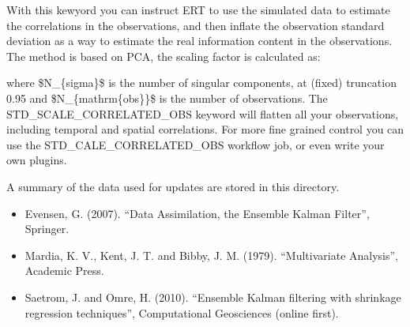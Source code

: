 \documentclass[letterpaper,10pt,english]{sphinxmanual}
\begin{document}
\begin{sphinxShadowBox}

With this kewyord you can instruct ERT to use the simulated data to
estimate the correlations in the observations, and then inflate the
observation standard deviation as a way to estimate the real information
content in the observations. The method is based on PCA, the scaling
factor is calculated as:

%
\begin{sphinxVerbatim}[commandchars=\\\{\}]
\PYGZbs{}\PYGZbs{}\PYGZbs{}\PYGZbs{}
\end{sphinxVerbatim}

where \$N\_\{sigma\}\$ is the number of singular components, at (fixed)
truncation 0.95 and \$N\_\{mathrm\{obs\}\}\$ is the number of observations.
The STD\_SCALE\_CORRELATED\_OBS keyword will flatten all your observations,
including temporal and spatial correlations. For more fine grained
control you can use the STD\_CALE\_CORRELATED\_OBS workflow job, or even
write your own plugins.
\end{sphinxShadowBox}
\label{\detokenize{keywords/index:update-log-path}}
\begin{sphinxShadowBox}

A summary of the data used for updates are stored in this directory.
\end{sphinxShadowBox}

\begin{itemize}
\item {} 
Evensen, G. (2007). “Data Assimilation, the Ensemble Kalman Filter”, Springer.

\item {} 
Mardia, K. V., Kent, J. T. and Bibby, J. M. (1979). “Multivariate Analysis”, Academic Press.

\item {} 
Saetrom, J. and Omre, H. (2010). “Ensemble Kalman filtering with shrinkage regression techniques”, Computational Geosciences (online first).

\end{itemize}
\end{document}
